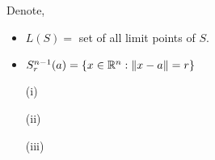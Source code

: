 \begin{soln}{2}
Denote, 
\begin{itemize}
  \item $ L(S) =$ set of all limit points of $S$.
  \item $ S^{n-1}_r(a) = \{x \in \mathbb{R}^n : \norm{x-a}=r\} $ 
\end{itemize}
  
\begin{itemize}
    \item[(i)]
    
    \item[(ii)]
    
    \item[(iii)]
    
\end{itemize}
\end{soln}
